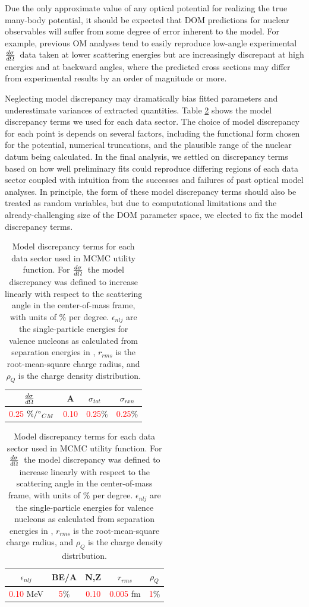 \documentclass[twocolumn,secnumarabic,amssymb, nobibnotes, aps, prl,
superscriptaddress, nobalancelastpage]{revtex4}
\newcommand{\tot}{\ensuremath{\sigma_{tot}}}
\newcommand{\rxn}{\ensuremath{\sigma_{rxn}}}
\newcommand{\el}{\ensuremath{\frac{\lowercase{d}\sigma}{\lowercase{d}\Omega}}}
\begin{document}
Due the only approximate value
of any optical potential for realizing the true many-body 
potential, it should be expected that DOM predictions for nuclear observables
will suffer from some degree of error inherent to the model. For example, previous
OM analyses tend to easily reproduce low-angle experimental \el\ data taken at
lower scattering energies but are increasingly discrepant at high energies
and at backward angles, where the predicted cross sections may
differ from experimental results by an order of magnitude or more. 

Neglecting model discrepancy may
dramatically bias fitted parameters and underestimate variances of extracted
quantities. Table \ref{ModelDiscrepancyTable} shows the model discrepancy terms we used 
for each data sector. The choice of model discrepancy for each point
is depends on several factors, including the functional form chosen for the
potential, numerical truncations, and the plausible range of the nuclear datum being 
calculated. In the final analysis, we settled on discrepancy terms based
on how well preliminary fits could reproduce differing regions of each data sector
coupled with intuition from the successes and failures of past optical model analyses.
In principle, the form of these model discrepancy terms should also be treated as random
variables, but due to computational limitations and the already-challenging size
of the DOM parameter space, we elected to fix the model discrepancy terms.

\begin{table}[tb]
    \centering
    \bgroup
    \def\arraystretch{1.8}%
    \begin{tabular}{ c c c c }
        \el\ & A & \tot\ & \rxn \\
        \hline
        \textcolor{red}{0.25} $\%/\degree_{CM}$ & \textcolor{red}{0.10}
            & \textcolor{red}{0.25}\% & \textcolor{red}{0.25}\% \\
    \end{tabular}
    \begin{tabular}{ c c c c c }
        $\epsilon_{nlj}$ & BE/A & N,Z & $r_{rms}$ & $\rho_{Q}$ \\
        \hline
        \textcolor{red}{0.10} MeV & \textcolor{red}{5}\% & \textcolor{red}{0.10}
        & \textcolor{red}{0.005} fm & \textcolor{red}{1}\%\\
    \end{tabular}
    \egroup
    \caption{Model discrepancy terms for each data sector used in
        MCMC utility function. For \el\, the model discrepancy was defined to
        increase linearly with respect to the scattering angle in the
        center-of-mass frame, with units of \% per degree. $\epsilon_{nlj}$
        are the single-particle energies for valence nucleons as calculated
        from separation energies in \cite{AME2016},
        $r_{rms}$ is the root-mean-square charge radius, and
    $\rho_{Q}$ is the charge density distribution.}
    \label{ModelDiscrepancyTable}
\end{table}
\end{document}
